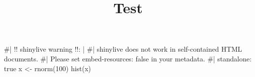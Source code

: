 \documentclass[
  12pt,
  a4paper, oneside]{starmastarticle}
\title{Test}
\author{}
\date{}
\newenvironment{Shaded}{\begin{snugshade}}{\end{snugshade}}
\newcommand{\NormalTok}[1]{\textcolor[rgb]{0.00,0.23,0.31}{#1}}
\begin{document}
\maketitle


\begin{Shaded}
\begin{Highlighting}[]
\NormalTok{\#| \textquotesingle{}!! shinylive warning !!\textquotesingle{}: |}
\NormalTok{\#|   shinylive does not work in self{-}contained HTML documents.}
\NormalTok{\#|   Please set \textasciigrave{}embed{-}resources: false\textasciigrave{} in your metadata.}
\NormalTok{\#| standalone: true}
\NormalTok{x \textless{}{-} rnorm(100)}
\NormalTok{hist(x)}
\end{Highlighting}
\end{Shaded}
\end{document}
